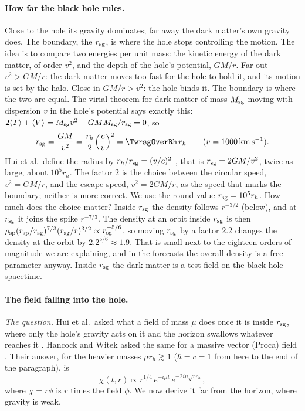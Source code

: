 \paragraph{How far the black hole rules.}
Close to the hole its gravity dominates; far away the dark matter's own gravity does. The boundary, the  $r_{\rm sg}$, is where the hole stops controlling the motion. The idea is to compare two energies per unit mass: the kinetic energy of the dark matter, of order $v^2$, and the depth of the hole's potential, $GM/r$. Far out $v^2>GM/r$: the dark matter moves too fast for the hole to hold it, and its motion is set by the halo. Close in $GM/r>v^2$: the hole binds it. The boundary is where the two are equal. The virial theorem for dark matter of mass $M_{\rm sg}$ moving with dispersion $v$ in the hole's potential says exactly this: $2\langle T\rangle+\langle V\rangle=M_{\rm sg}v^2-GMM_{\rm sg}/r_{\rm sg}=0$, so
\[
  r_{\rm sg}=\frac{GM}{v^2}=\frac{r_h}2\Big(\frac{c}{v}\Big)^2=\TwrsgOverRh\,r_h\qquad(v=1000\,{\rm km\,s^{-1}}).
\]
Hui et al.\ define the radius by $r_h/r_{\rm sg}=(v/c)^2$ \cite[eq.~(1.5)]{HuiKabat2019}, that is $r_{\rm sg}=2GM/v^2$, twice as large, about $10^5r_h$. The factor $2$ is the choice between the circular speed, $v^2=GM/r$, and the escape speed, $v^2=2GM/r$, as the speed that marks the boundary; neither is more correct. We use the round value $r_{\rm sg}=10^5r_h$. How much does the choice matter? Inside $r_{\rm sg}$ the density follows $r^{-3/2}$ (below), and at $r_{\rm sg}$ it joins the spike $r^{-7/3}$. The density at an orbit inside $r_{\rm sg}$ is then $\rho_{\rm sp}(r_{\rm sp}/r_{\rm sg})^{7/3}(r_{\rm sg}/r)^{3/2}\propto r_{\rm sg}^{-5/6}$, so moving $r_{\rm sg}$ by a factor $2.2$ changes the density at the orbit by $2.2^{5/6}\approx1.9$. That is small next to the eighteen orders of magnitude we are explaining, and in the forecasts the overall density is a free parameter anyway. Inside $r_{\rm sg}$ the dark matter is a test field on the black-hole spacetime.

\paragraph{The field falling into the hole.}
\emph{The question.} Hui et al.\ asked what a field of mass $\mu$ does once it is inside $r_{\rm sg}$, where only the hole's gravity acts on it and the horizon swallows whatever reaches it \cite[Sec.~2]{HuiKabat2019}. Hancock and Witek asked the same for a massive vector (Proca) field \cite[Sec.~V]{HancockWitek2025}. Their answer, for the heavier masses $\mu r_h\gtrsim1$ ($\hbar=c=1$ from here to the end of the paragraph), is \cite[eq.~(2.17)]{HuiKabat2019}
\begin{equation}
  \chi(t,r)\propto r^{1/4}\,e^{-i\mu t}\,e^{-2i\mu\sqrt{rr_h}} ,
  \label{T2a:eq:proca-heavy}
\end{equation}
where $\chi=r\phi$ is $r$ times the field $\phi$. We now derive it far from the horizon, where gravity is weak.

